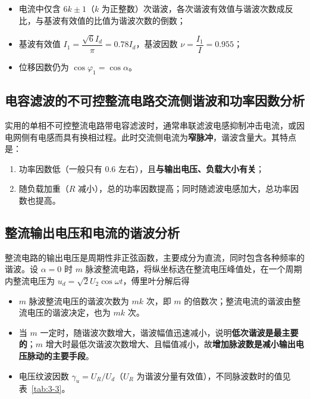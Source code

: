 
\begin{itemize}
  \item 电流中仅含 $6k\pm1$（$k$ 为正整数）次谐波，各次谐波有效值与谐波次数成反比，与基波有效值的比值为谐波次数的倒数；
  \item 基波有效值 $I_1=\dfrac{\sqrt{6}I_d}{\pi}=0.78I_d$，基波因数 $\nu=\dfrac{I_1}{I}=0.955$；
  \item 位移因数仍为 $\cos\varphi_1=\cos\alpha$。
\end{itemize}

\keyformula{\lambda=0.955\cos\alpha}

\subsection{电容滤波的不可控整流电路交流侧谐波和功率因数分析}

实用的单相不可控整流电路带电容滤波时，通常串联滤波电感抑制冲击电流，或因电网侧有电感而具有换相过程。此时交流侧电流为\textbf{窄脉冲}，谐波含量大。其特点是：

\begin{enumerate}
  \item 功率因数低（一般只有 0.6 左右），且\textbf{与输出电压、负载大小有关}；
  \item 随负载加重（$R$ 减小），总的功率因数提高；同时随滤波电感加大，总功率因数也提高。
\end{enumerate}

\subsection{整流输出电压和电流的谐波分析}

整流电路的输出电压是周期性非正弦函数，主要成分为直流，同时包含各种频率的谐波。设 $\alpha=0$ 时 $m$ 脉波整流电路，将纵坐标选在整流电压峰值处，在一个周期内整流电压为 $u_d=\sqrt{2}U_2\cos\omega t$，傅里叶分解后得


\begin{itemize}
  \item $m$ 脉波整流电压的谐波次数为 $mk$ 次，即 $m$ 的倍数次；整流电流的谐波由整流电压的谐波决定，也为 $mk$ 次。
  \item 当 $m$ 一定时，随谐波次数增大，谐波幅值迅速减小，说明\textbf{低次谐波是最主要的}；$m$ 增大时最低次谐波次数增大、且幅值减小，故\textbf{增加脉波数是减小输出电压脉动的主要手段}。
  \item 电压纹波因数 $\gamma_u=U_R/U_d$（$U_R$ 为谐波分量有效值），不同脉波数时的值见表~\ref{tab:3-3}。
\end{itemize}

